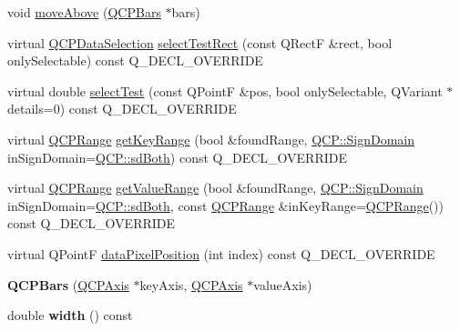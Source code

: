 \begin{DoxyCompactItemize}
\item 
void \hyperlink{class_q_c_p_bars_ac22e00a6a41509538c21b04f0a57318c}{move\+Above} (\hyperlink{class_q_c_p_bars}{Q\+C\+P\+Bars} $\ast$bars)
\item 
virtual \hyperlink{class_q_c_p_data_selection}{Q\+C\+P\+Data\+Selection} \hyperlink{class_q_c_p_bars_ab03bb6125c3e983b89d694f75ce6b3d5}{select\+Test\+Rect} (const Q\+RectF \&rect, bool only\+Selectable) const Q\+\_\+\+D\+E\+C\+L\+\_\+\+O\+V\+E\+R\+R\+I\+DE
\item 
virtual double \hyperlink{class_q_c_p_bars_a121f899c27af3186fe93dcd0eb98f49b}{select\+Test} (const Q\+PointF \&pos, bool only\+Selectable, Q\+Variant $\ast$details=0) const Q\+\_\+\+D\+E\+C\+L\+\_\+\+O\+V\+E\+R\+R\+I\+DE
\item 
virtual \hyperlink{class_q_c_p_range}{Q\+C\+P\+Range} \hyperlink{class_q_c_p_bars_ac5a3854774d9d9cd129b1eae1426de2d}{get\+Key\+Range} (bool \&found\+Range, \hyperlink{namespace_q_c_p_afd50e7cf431af385614987d8553ff8a9}{Q\+C\+P\+::\+Sign\+Domain} in\+Sign\+Domain=\hyperlink{namespace_q_c_p_afd50e7cf431af385614987d8553ff8a9a3dee7e9cd2fedce9253b83e172626a6c}{Q\+C\+P\+::sd\+Both}) const Q\+\_\+\+D\+E\+C\+L\+\_\+\+O\+V\+E\+R\+R\+I\+DE
\item 
virtual \hyperlink{class_q_c_p_range}{Q\+C\+P\+Range} \hyperlink{class_q_c_p_bars_a02cee4bf94d48a1e5f6fc185d9a10477}{get\+Value\+Range} (bool \&found\+Range, \hyperlink{namespace_q_c_p_afd50e7cf431af385614987d8553ff8a9}{Q\+C\+P\+::\+Sign\+Domain} in\+Sign\+Domain=\hyperlink{namespace_q_c_p_afd50e7cf431af385614987d8553ff8a9a3dee7e9cd2fedce9253b83e172626a6c}{Q\+C\+P\+::sd\+Both}, const \hyperlink{class_q_c_p_range}{Q\+C\+P\+Range} \&in\+Key\+Range=\hyperlink{class_q_c_p_range}{Q\+C\+P\+Range}()) const Q\+\_\+\+D\+E\+C\+L\+\_\+\+O\+V\+E\+R\+R\+I\+DE
\item 
virtual Q\+PointF \hyperlink{class_q_c_p_bars_a55cdaf565cd3384158d1f7f89533bc2d}{data\+Pixel\+Position} (int index) const Q\+\_\+\+D\+E\+C\+L\+\_\+\+O\+V\+E\+R\+R\+I\+DE
\item 
{\bfseries Q\+C\+P\+Bars} (\hyperlink{class_q_c_p_axis}{Q\+C\+P\+Axis} $\ast$key\+Axis, \hyperlink{class_q_c_p_axis}{Q\+C\+P\+Axis} $\ast$value\+Axis)\hypertarget{class_q_c_p_bars_a64006999ad9dff308f40df41cef176ad}{}\label{class_q_c_p_bars_a64006999ad9dff308f40df41cef176ad}

\item 
double {\bfseries width} () const \hypertarget{class_q_c_p_bars_a42798c38abd5f5db22bd45d77f429625}{}\label{class_q_c_p_bars_a42798c38abd5f5db22bd45d77f429625}


\end{DoxyCompactItemize}
